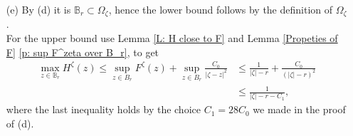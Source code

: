 \documentclass[11pt]{article}
\makeatletter
\renewenvironment{proof}[1][\proofname]{
   \par\pushQED{\qed}\normalfont
   \topsep6\p@\@plus6\p@\relax
   \trivlist\item[\hskip\labelsep\bfseries#1\@addpunct{.}]
   \ignorespaces
}{
   \popQED\endtrivlist\@endpefalse
}
\numberwithin{equation}{section}
\def\OZ{\Omega_{\zeta}}
\makeatother
\begin{document}
\begin{proof}[Proof of Lemma \ref{Properties of H}]
\begin{itemize}
    \item[(e)]
      By (d) it is $\mathbb{B}_r \subset \OZ$, hence 
      the lower bound follows by the definition of $\OZ$.\\
      For the upper bound use Lemma \ref{L: H close to F} and 
      Lemma \ref{Propeties of F} \ref{p: sup F^zeta over B_r}, to get
      \begin{equation}\nonumber
        \begin{split}
          \max_{z \in \mathbb{B}_r} H^{\zeta}(z) 
           \leq \sup_{z \in B_r} F^{\zeta}(z) + \sup_{z \in B_r} \frac{C_0}{|\zeta - z|^2}
          &\leq \frac{1}{|\zeta| - r} + \frac{C_0}{(|\zeta| - r)^2}\\
          &\leq \frac{1}{|\zeta|-r -C_1},
        \end{split} 
      \end{equation}
      where the last inequality holds by the choice $C_1 = 28 C_0$ we made in 
      the proof of (d). %


\end{itemize}
\end{proof}
\end{document}

